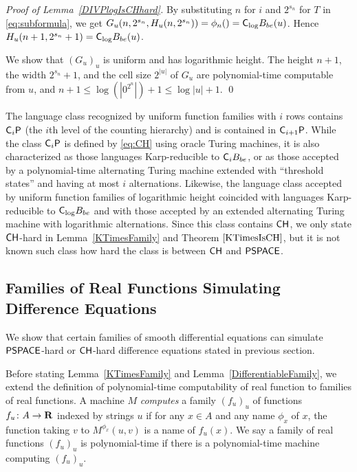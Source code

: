 \begin{proof}[\textup{Proof of Lemma~\ref{DIVPlogIsCHhard}}]
By substituting $n$ for $i$ and $2^{s_n}$ for $T$ in \eqref{eq:subformula},
we get $G_u(n, 2^{s_n}, H_u(n,2^{s_n})) = \phi_n() = \mathsf{C}_{\log} B_{be}(u)$.
Hence $H_u(n+1, 2^{s_n}+1) = \mathsf{C}_{\log} B_{be}(u)$.
 
We show that $(G_u)_u$ is uniform and has logarithmic height. 
The height $n+1$, the width $2^{s_n}+1$, and the cell size $2^{|u|}$
of $G_u$ are polynomial-time computable from $u$, 
and $n+1 \le \log(|0^{2^n}|) + 1 \le \log|u| + 1$.
\qed
\end{proof}


The language class recognized by uniform function families with $i$ rows
contains $\mathsf{C}_i \mathsf{P}$ (the $i$th level of the counting hierarchy)
and is contained in $\mathsf{C}_{i+1} \mathsf{P}$.
While the class $\mathsf{C}_i \mathsf{P}$ is defined by \eqref{eq:CH} using oracle Turing machines,
it is also characterized as those languages Karp-reducible to $\mathsf{C}_i B_{be}$, or 
as those accepted by a polynomial-time alternating Turing machine 
extended with ``threshold states'' and having at most $i$ alternations.
Likewise, 
the language class accepted by uniform function families of logarithmic height
coincided with languages Karp-reducible to $\mathsf{C}_{\log} B_{be}$
and with those accepted by an extended alternating Turing machine with logarithmic alternations.
Since this class contains $\mathsf{CH}$,
we only state $\mathsf{CH}$-hard in Lemma~\ref{KTimesFamily} and Theorem $\ref{KTimesIsCH}$,
but it is not known such class how hard the class is between $\mathsf{CH}$ and $\mathsf{PSPACE}$.



\subsection{Families of Real Functions Simulating Difference Equations}
\label{subsection: ode family}
We show that certain families of smooth differential equations can simulate 
$\mathsf{PSPACE}$-hard or $\mathsf{CH}$-hard difference equations stated in previous section.

Before stating Lemma~\ref{KTimesFamily} and Lemma~\ref{DifferentiableFamily},
we extend the definition of polynomial-time computability of real function
to families of real functions.
A machine $M$ \emph{computes} a family $(f_u)_u$ of functions $f _u \colon A \to \mathbf R$ 
indexed by strings $u$
if for any $x \in A$ and any name $\phi_x$ of $x$,
the function taking $v$ to $M ^{\phi _x} (u, v)$ is a name of $f _u (x)$.
We say a family of real functions $(f_u)_u$ is polynomial-time if there is
a polynomial-time machine computing $(f_u)_u$.


